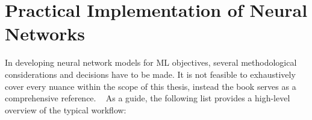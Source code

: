 \clearpage

\section{Practical Implementation of Neural Networks}

In developing neural network models for \ac{ML} objectives,
several methodological considerations and decisions 
have to be made.
It is not feasible to exhaustively cover
every nuance within the scope of this thesis, 
instead the book  
serves as a comprehensive reference.%
~
As a guide, 
the following list provides a high-level overview of the typical workflow:%
\sidenote[][-4em]{%
    The list draws inspiration from chapter 19.9 in 
    \cite{russellArtificial2009} and chapter 4 in
    \cite{cholletDeep2021}.
}%

